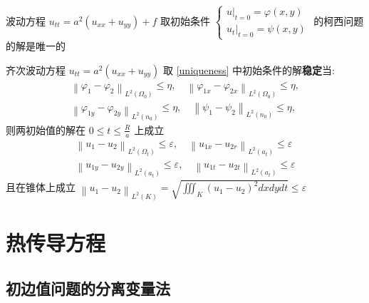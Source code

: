 \documentclass[10pt]{yerbaformat}
\begin{document}
\begin{theorem}
    波动方程 $u_{tt}=a^{2}\left(u_{xx}+u_{y y}\right)+f$ 取初始条件 $\left\{\begin{array}{l}\left.u\right|_{t=0}=\varphi(x, y) \\ \left.u_{t}\right|_{t=0}=\psi(x, y)\end{array}\right.$ 的柯西问题的解是唯一的 \label{uniqueness}
\end{theorem}

\begin{theorem}
    齐次波动方程 $u_{tt}=a^{2}\left(u_{xx}+u_{y y}\right)$ 取 \ref{uniqueness} 中初始条件的解\textbf{稳定}当:
    $$
        \begin{array}{l}
            \left\|\varphi_{1}-\varphi_{2}\right\|_{L^{2}\left(\Omega_{0}\right)} \leqslant \eta, \quad\left\|\varphi_{1 x}-\varphi_{2 x}\right\|_{L^{2}\left(\Omega_{0}\right)} \leqslant \eta, \\
            \left\|\varphi_{1 y}-\varphi_{2 y}\right\|_{L^{2}\left(n_{0}\right)} \leqslant \eta, \quad\left\|\psi_{1}-\psi_{2}\right\|_{L^{2}\left(n_{0}\right)} \leqslant \eta,
        \end{array}
    $$
    则两初始值的解在 $0 \leqslant t \leqslant \frac{R}{a}$ 上成立
    $$
        \begin{array}{l}
            \left\|u_{1}-u_{2}\right\|_{L^{2}\left(\Omega_{t}\right)} \leqslant \varepsilon, \quad\left\|u_{1 x}-u_{2 r}\right\|_{L^{2}\left(a_{t}\right)} \leqslant \varepsilon \\
            \left\|u_{1 y}-u_{2 y}\right\|_{L^{2}\left(a_{t}\right)} \leqslant \varepsilon, \quad\left\|u_{1 t}-u_{2 t}\right\|_{L^{2}\left(a_{t}\right)} \leqslant \varepsilon
        \end{array}
    $$
    且在锥体上成立 $\left\|u_{1}-u_{2}\right\|_{L^{2}(K)}=\sqrt{\iiint_{K}\left(u_{1}-u_{2}\right)^{2} d x d y d t} \leqslant \varepsilon$
\end{theorem}


\section{热传导方程}

\subsection{初边值问题的分离变量法}
\end{document}
